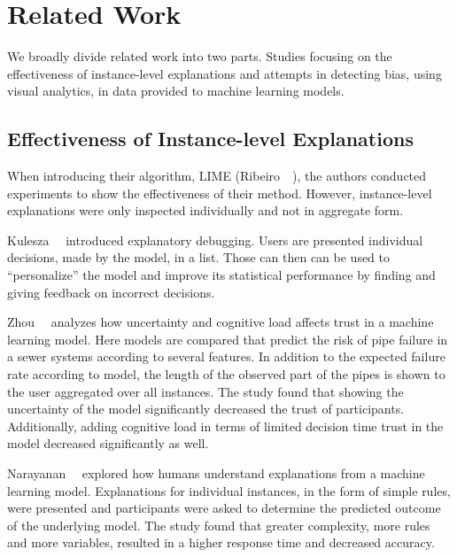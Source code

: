 \section{Related Work}
\label{sec:relatedwork}

We broadly divide related work into two parts.
Studies focusing on the effectiveness of instance-level explanations and attempts in detecting bias, using visual analytics, in data provided to machine learning models.


\subsection{Effectiveness of Instance-level Explanations}
When introducing their algorithm, LIME (Ribeiro~\etal~\cite{DBLP:journals/corr/RibeiroSG16, anchors:aaai18,2016arXiv161105817T}), the authors conducted experiments to show the effectiveness of their method.
However, instance-level explanations were only inspected individually and not in aggregate form.

Kulesza~\etal~\cite{Kulesza:2015:PED:2678025.2701399} introduced explanatory debugging.
Users are presented individual decisions, made by the model, in a list.
Those can then can be used to ``personalize'' the model and improve its statistical performance by finding and giving feedback on incorrect decisions.

Zhou~\etal~\cite{Zhou:2017:EUC:3176444.3176447} analyzes how uncertainty and cognitive load affects trust in a machine learning model.
Here models are compared that predict the risk of pipe failure in a sewer systems according to several features.
In addition to the expected failure rate according to model, the length of the observed part of the pipes is shown to the user aggregated over all instances.
The study found that showing the uncertainty of the model significantly decreased the trust of participants.
Additionally, adding cognitive load in terms of limited decision time trust in the model decreased significantly as well.

Narayanan~\etal~\cite{2018arXiv180200682N} explored how humans understand explanations from a machine learning model.
Explanations for individual instances, in the form of simple rules, were presented and participants were asked to determine the predicted outcome of the underlying model.
The study found that greater complexity, more rules and more variables, resulted in a higher response time and decreased accuracy.

